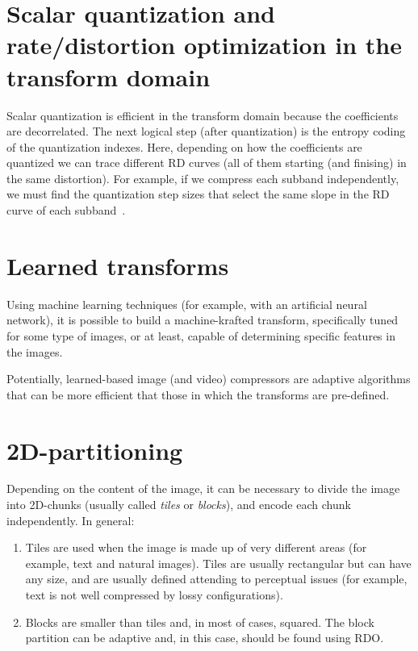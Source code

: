 
\section{Scalar quantization and rate/distortion optimization in the transform domain}

Scalar quantization is efficient in the transform domain because the
coefficients are decorrelated. The next logical step (after
quantization) is the entropy coding of the quantization indexes. Here,
depending on how the coefficients are quantized we can trace different
RD curves (all of them starting (and finising) in the same
distortion). For example, if we compress each subband independently,
we must find the quantization step sizes that select the same slope in
the RD curve of each subband~\cite{vruiz__information_theory}.


\section{Learned transforms}

Using machine learning techniques (for example, with an artificial
neural network), it is possible to build a machine-krafted transform,
specifically tuned for some type of images, or at least, capable of
determining specific features in the images.

Potentially, learned-based image (and video) compressors are adaptive
algorithms that can be more efficient that those in which the
transforms are pre-defined.


\section{2D-partitioning}

Depending on the content of the image, it can be necessary to divide
the image into 2D-chunks (usually called \emph{tiles} or
\emph{blocks}), and encode each chunk independently. In general:
\begin{enumerate}
\item Tiles are used when the image is made up of very different areas
  (for example, text and natural images). Tiles are usually
  rectangular but can have any size, and are usually defined attending
  to perceptual issues (for example, text is not well compressed by
  lossy configurations).
\item Blocks are smaller than tiles and, in most of cases,
  squared. The block partition can be adaptive and, in this case,
  should be found using RDO.
\end{enumerate}

